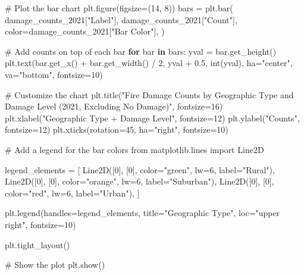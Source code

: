 \documentclass[
  letterpaper,
  DIV=11,
  numbers=noendperiod]{scrartcl}
\newenvironment{Shaded}{\begin{snugshade}}{\end{snugshade}}
\newcommand{\BuiltInTok}[1]{\textcolor[rgb]{0.00,0.23,0.31}{#1}}
\newcommand{\CommentTok}[1]{\textcolor[rgb]{0.37,0.37,0.37}{#1}}
\newcommand{\ControlFlowTok}[1]{\textcolor[rgb]{0.00,0.23,0.31}{\textbf{#1}}}
\newcommand{\DecValTok}[1]{\textcolor[rgb]{0.68,0.00,0.00}{#1}}
\newcommand{\FloatTok}[1]{\textcolor[rgb]{0.68,0.00,0.00}{#1}}
\newcommand{\ImportTok}[1]{\textcolor[rgb]{0.00,0.46,0.62}{#1}}
\newcommand{\KeywordTok}[1]{\textcolor[rgb]{0.00,0.23,0.31}{\textbf{#1}}}
\newcommand{\NormalTok}[1]{\textcolor[rgb]{0.00,0.23,0.31}{#1}}
\newcommand{\OperatorTok}[1]{\textcolor[rgb]{0.37,0.37,0.37}{#1}}
\newcommand{\StringTok}[1]{\textcolor[rgb]{0.13,0.47,0.30}{#1}}
\begin{document}
\begin{Shaded}
\begin{Highlighting}[]
\CommentTok{\# Plot the bar chart}
\NormalTok{plt.figure(figsize}\OperatorTok{=}\NormalTok{(}\DecValTok{14}\NormalTok{, }\DecValTok{8}\NormalTok{))}
\NormalTok{bars }\OperatorTok{=}\NormalTok{ plt.bar(}
\NormalTok{    damage\_counts\_2021[}\StringTok{"Label"}\NormalTok{],}
\NormalTok{    damage\_counts\_2021[}\StringTok{"Count"}\NormalTok{],}
\NormalTok{    color}\OperatorTok{=}\NormalTok{damage\_counts\_2021[}\StringTok{"Bar Color"}\NormalTok{],}
\NormalTok{)}

\CommentTok{\# Add counts on top of each bar}
\ControlFlowTok{for}\NormalTok{ bar }\KeywordTok{in}\NormalTok{ bars:}
\NormalTok{    yval }\OperatorTok{=}\NormalTok{ bar.get\_height()}
\NormalTok{    plt.text(bar.get\_x() }\OperatorTok{+}\NormalTok{ bar.get\_width() }\OperatorTok{/} \DecValTok{2}\NormalTok{, yval }\OperatorTok{+} \FloatTok{0.5}\NormalTok{, }\BuiltInTok{int}\NormalTok{(yval), ha}\OperatorTok{=}\StringTok{"center"}\NormalTok{, va}\OperatorTok{=}\StringTok{"bottom"}\NormalTok{, fontsize}\OperatorTok{=}\DecValTok{10}\NormalTok{)}

\CommentTok{\# Customize the chart}
\NormalTok{plt.title(}\StringTok{"Fire Damage Counts by Geographic Type and Damage Level (2021, Excluding No Damage)"}\NormalTok{, fontsize}\OperatorTok{=}\DecValTok{16}\NormalTok{)}
\NormalTok{plt.xlabel(}\StringTok{"Geographic Type + Damage Level"}\NormalTok{, fontsize}\OperatorTok{=}\DecValTok{12}\NormalTok{)}
\NormalTok{plt.ylabel(}\StringTok{"Counts"}\NormalTok{, fontsize}\OperatorTok{=}\DecValTok{12}\NormalTok{)}
\NormalTok{plt.xticks(rotation}\OperatorTok{=}\DecValTok{45}\NormalTok{, ha}\OperatorTok{=}\StringTok{"right"}\NormalTok{, fontsize}\OperatorTok{=}\DecValTok{10}\NormalTok{)}

\CommentTok{\# Add a legend for the bar colors}
\ImportTok{from}\NormalTok{ matplotlib.lines }\ImportTok{import}\NormalTok{ Line2D}

\NormalTok{legend\_elements }\OperatorTok{=}\NormalTok{ [}
\NormalTok{    Line2D([}\DecValTok{0}\NormalTok{], [}\DecValTok{0}\NormalTok{], color}\OperatorTok{=}\StringTok{"green"}\NormalTok{, lw}\OperatorTok{=}\DecValTok{6}\NormalTok{, label}\OperatorTok{=}\StringTok{"Rural"}\NormalTok{),}
\NormalTok{    Line2D([}\DecValTok{0}\NormalTok{], [}\DecValTok{0}\NormalTok{], color}\OperatorTok{=}\StringTok{"orange"}\NormalTok{, lw}\OperatorTok{=}\DecValTok{6}\NormalTok{, label}\OperatorTok{=}\StringTok{"Suburban"}\NormalTok{),}
\NormalTok{    Line2D([}\DecValTok{0}\NormalTok{], [}\DecValTok{0}\NormalTok{], color}\OperatorTok{=}\StringTok{"red"}\NormalTok{, lw}\OperatorTok{=}\DecValTok{6}\NormalTok{, label}\OperatorTok{=}\StringTok{"Urban"}\NormalTok{),}
\NormalTok{]}

\NormalTok{plt.legend(handles}\OperatorTok{=}\NormalTok{legend\_elements, title}\OperatorTok{=}\StringTok{"Geographic Type"}\NormalTok{, loc}\OperatorTok{=}\StringTok{"upper right"}\NormalTok{, fontsize}\OperatorTok{=}\DecValTok{10}\NormalTok{)}

\NormalTok{plt.tight\_layout()}

\CommentTok{\# Show the plot}
\NormalTok{plt.show()}
\end{Highlighting}
\end{Shaded}
\end{document}
